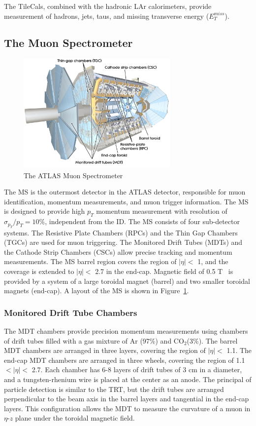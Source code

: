 The TileCals, combined with the hadronic LAr calorimeters, provide measurement of hadrons, jets, taus, and missing transverse energy ($E_{T}^{miss}$).


\subsection{The Muon Spectrometer}
\label{sec:atlas:ms}

\begin{figure}[!htb]
    \includegraphics[width=0.7\textwidth]{figures/ms.png}
    \centering
    \caption{The ATLAS Muon Spectrometer}
    \label{fig:ms}
\end{figure}
The MS is the outermost detector in the ATLAS detector, responsible for muon identification, momentum measurements, and muon trigger information. The MS is designed to provide high $p_{T}$ momentum measurement with resolution of $\sigma_{p_{T}} / p_{T} = 10\%$, independent from the ID. The MS consists of four sub-detector systems. The Resistive Plate Chambers (RPCs) and the Thin Gap Chambers (TGCs) are used for muon triggering. The Monitored Drift Tubes (MDTs) and the Cathode Strip Chambers (CSCs) allow precise tracking and momentum measurements. The MS barrel region covers the region of $|\eta|<$ 1, and the coverage is extended to $|\eta|<$ 2.7 in the end-cap. Magnetic field of 0.5 T~\cite{ARNAUD2008265} is provided by a system of a large toroidal magnet (barrel) and two smaller toroidal magnets (end-cap). A layout of the MS is shown in Figure~\ref{fig:ms}.

\subsubsection{Monitored Drift Tube Chambers}
\label{sec:atlas:mdt}

The MDT chambers provide precision momentum measurements using chambers of drift tubes filled with a gas mixture of Ar (97\%) and $\mathrm{CO}_{2}$(3\%). The barrel MDT chambers are arranged in three layers, covering the region of $|\eta|<$ 1.1. The end-cap MDT chambers are arranged in three wheels, covering the region of 1.1 $<|\eta|<$ 2.7. Each chamber has 6-8 layers of drift tubes of 3 \si{\centi\meter} in a diameter, and a tungsten-rhenium wire is placed at the center as an anode. The principal of particle detection is similar to the TRT, but the drift tubes are arranged perpendicular to the beam axis in the barrel layers and tangential in the end-cap layers. This configuration allows the MDT to measure the curvature of a muon in $\eta$-$z$ plane under the toroidal magnetic field.


